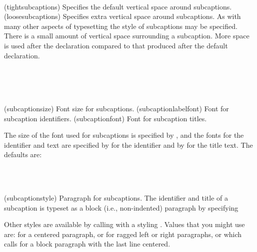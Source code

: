 \begin{syntax}
\cmd{\tightsubcaptions} \cmd{\loosesubcaptions} \\
\end{syntax}
\glossary(tightsubcaptions)%
  {}%
  {Specifies the default vertical space around subcaptions.}
\glossary(loosesubcaptions)%
  {}%
  {Specifies extra vertical space around subcaptions.}
As with many other aspects of typesetting the style of 
subcaptions may 
be specified. There is a small amount of vertical space 
surrounding a subcaption. More space is used after the \cmd{\loosesubcaptions}
declaration compared to that produced after the default
\cmd{\tightsubcaptions} declaration.

\begin{syntax}
\cmd{\subcaptionsize} \\
\cmd{\subcaptionlabelfont} \\
\cmd{\subcaptionfont} \\
\end{syntax}
\glossary(subcaptionsize)%
  {}%
  {Font size for subcaptions.}
\glossary(subcaptionlabelfont)%
  {}%
  {Font for subcaption identifiers.}
\glossary(subcaptionfont)%
  {}%
  {Font for subcaption titles.}

The size of the font used for subcaptions is specified by 
\cmd{\subcaptionsize}, and the fonts for the identifier and text
are specified by \cmd{\subcaptionlabelfont} for the identifier and by
\cmd{\subcaptionfont} for the title text. The defaults are:
\begin{lcode}
\subcaptionsize{\footnotesize}
\subcaptionlabelfont{\normalfont}
\subcaptionfont{\normalfont}
\end{lcode}

\begin{syntax}
\cmd{\subcaptionstyle} \\
\cmd{\raggedleft} \cmd{\centering} \cmd{\raggedright} \cmd{\centerlastline} \\
\end{syntax}
\glossary(subcaptionstyle)%
  {}%
  {Paragraph  for subcaptions.}
The identifier and title of a subcaption is typeset as a block (i.e.,
non-indented) paragraph by specifying
\begin{lcode}
\subcaptionstyle{}
\end{lcode}
Other styles are available by calling \cmd{\subcaptionstyle}
with a styling . Values that you might use are:
\cmd{\centering} for a centered paragraph, \cmd{\raggedleft} or
\cmd{\raggedright} for ragged left or right paragraphs, or
\cmd{\centerlastline} which calls for a block paragraph with the last
line centered.

